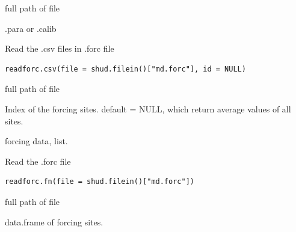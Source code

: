 \documentclass[a4paper]{book}
\begin{document}
%
\begin{Arguments}
\begin{ldescription}
\item[\code{file}] full path of file
\end{ldescription}
\end{Arguments}
%
\begin{Value}
.para or .calib
\end{Value}
%
\begin{Description}\relax
Read the .csv files in .forc file
\end{Description}
%
\begin{Usage}
\begin{verbatim}
readforc.csv(file = shud.filein()["md.forc"], id = NULL)
\end{verbatim}
\end{Usage}
%
\begin{Arguments}
\begin{ldescription}
\item[\code{file}] full path of file

\item[\code{id}] Index of the forcing sites.  default = NULL, which return average values of all sites.
\end{ldescription}
\end{Arguments}
%
\begin{Value}
forcing data, list.
\end{Value}
%
\begin{Description}\relax
Read the .forc file
\end{Description}
%
\begin{Usage}
\begin{verbatim}
readforc.fn(file = shud.filein()["md.forc"])
\end{verbatim}
\end{Usage}
%
\begin{Arguments}
\begin{ldescription}
\item[\code{file}] full path of file
\end{ldescription}
\end{Arguments}
%
\begin{Value}
data.frame of forcing sites.
\end{Value}
\end{document}
